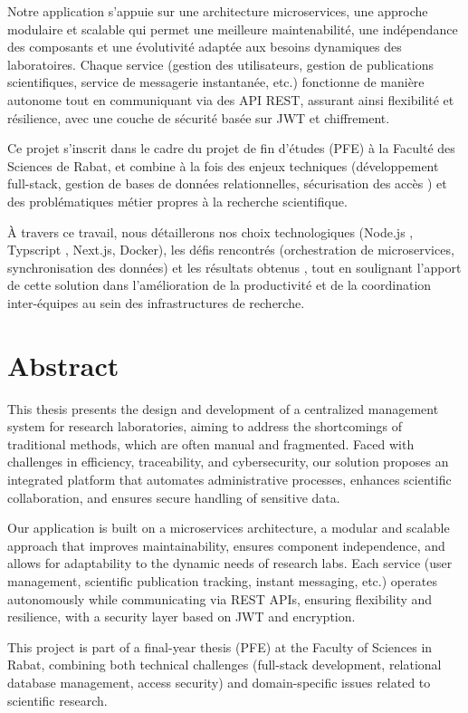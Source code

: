 \documentclass[12pt]{rapportPfe}
\begin{document}
Notre application s’appuie sur une architecture microservices, une approche modulaire et scalable qui permet une meilleure maintenabilité, une indépendance des composants et une évolutivité adaptée aux besoins dynamiques des laboratoires. Chaque service (gestion des utilisateurs, gestion de publications scientifiques, service de messagerie instantanée, etc.) fonctionne de manière autonome tout en communiquant via des API REST, assurant ainsi flexibilité et résilience, avec une couche de sécurité basée sur JWT et chiffrement.

Ce projet s’inscrit dans le cadre du projet de fin d’études (PFE) à la Faculté des Sciences de Rabat, et combine à la fois des enjeux techniques (développement full-stack, gestion de bases de données relationnelles, sécurisation des accès ) et des problématiques métier propres à la recherche scientifique.

À travers ce travail, nous détaillerons nos choix technologiques (Node.js , Typscript , Next.js, Docker), les défis rencontrés (orchestration de microservices, synchronisation des données) et les résultats obtenus , tout en soulignant l’apport de cette solution dans l’amélioration de la productivité et de la coordination inter-équipes au sein des infrastructures de recherche.

\chapter*{Abstract}
This thesis presents the design and development of a centralized management system for research laboratories, aiming to address the shortcomings of traditional methods, which are often manual and fragmented. Faced with challenges in efficiency, traceability, and cybersecurity, our solution proposes an integrated platform that automates administrative processes, enhances scientific collaboration, and ensures secure handling of sensitive data.

Our application is built on a microservices architecture, a modular and scalable approach that improves maintainability, ensures component independence, and allows for adaptability to the dynamic needs of research labs. Each service (user management, scientific publication tracking, instant messaging, etc.) operates autonomously while communicating via REST APIs, ensuring flexibility and resilience, with a security layer based on JWT and encryption.

This project is part of a final-year thesis (PFE) at the Faculty of Sciences in Rabat, combining both technical challenges (full-stack development, relational database management, access security) and domain-specific issues related to scientific research.
\end{document}
